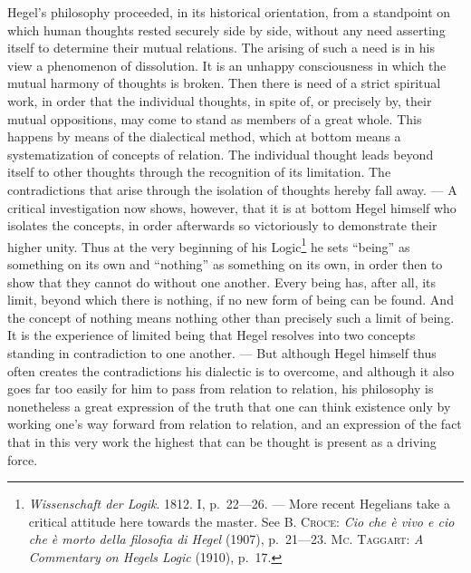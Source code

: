\documentclass[12pt]{article}
\newcommand{\opage}[1]{\marginnote{\footnotesize\textit{[#1]}}}
\begin{document}
Hegel's philosophy proceeded, in its historical orientation, from a
standpoint on which human thoughts rested securely side by side, without any
need asserting itself to determine their mutual relations. The arising of
such a need is in his view a phenomenon of dissolution. It is an unhappy
consciousness in which the mutual harmony of thoughts is broken. Then \opage{12}there
is need of a strict spiritual work, in order that the individual thoughts,
in spite of, or precisely by, their mutual oppositions, may come to stand as
members of a great whole. This happens by means of the dialectical method,
which at bottom means a systematization of concepts of relation. The
individual thought leads beyond itself to other thoughts through the
recognition of its limitation. The contradictions that arise through the
isolation of thoughts hereby fall away. --- A critical investigation now
shows, however, that it is at bottom Hegel himself who isolates the concepts,
in order afterwards so victoriously to demonstrate their higher unity. Thus
at the very beginning of his Logic\footnote{\textit{Wissenschaft der Logik}.
1812. I, p.~22---26. --- More recent Hegelians take a critical attitude here
towards the master. See \textsc{B. Croce}: \textit{Cio che è vivo e cio che è
morto della filosofia di Hegel} (1907), p.~21---23. \textsc{Mc. Taggart}:
\textit{A Commentary on Hegels Logic} (1910), p.~17.} he sets ``being'' as
something on its own and ``nothing'' as something on its own, in order then
to show that they cannot do without one another. Every being has, after all,
its limit, beyond which there is nothing, if no new form of being can be
found. And the concept of nothing means nothing other than precisely such a
limit of being. It is the experience of limited being that Hegel resolves
into two concepts standing in contradiction to one another. --- But although
Hegel himself thus often creates the contradictions his dialectic is to
overcome, and although it also goes far too easily for him to pass from
relation to relation, his philosophy is nonetheless a great expression of
the truth that one can think existence only by working one's way forward
from relation to relation, and an expression of the fact that in this very
work the highest that can be thought is present as a driving force.
\end{document}
